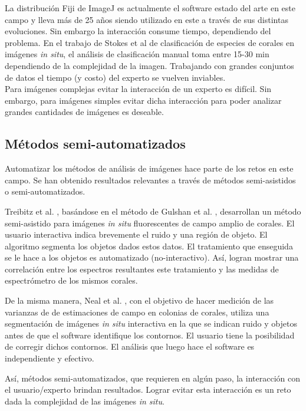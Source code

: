 \documentclass[journal]{IEEEtran}
\begin{document}
La distribución Fiji
de ImageJ \cite{schindelin_fiji:_2012} es actualmente el software estado del arte en este
campo y lleva más de 25 años \cite{schneider_nih_2012} siendo utilizado en este a través
de sus distintas evoluciones. Sin embargo la interacción consume tiempo, dependiendo del
problema. En el trabajo
de Stokes et al \cite{stokes_automated_2009} de clasificación de especies de corales en
imágenes \textit{in situ}, el análisis de clasificación manual toma entre 15-30 min dependiendo de la
complejidad de la imagen. Trabajando con grandes conjuntos de datos el tiempo (y costo)
del experto se vuelven inviables.\\


Para imágenes complejas evitar la interacción de un experto es difícil. Sin embargo, para
imágenes simples evitar dicha interacción para poder analizar grandes cantidades de
imágenes es deseable.


\subsection{Métodos semi-automatizados}
Automatizar los métodos de análisis de imágenes hace parte de los retos en este campo.
Se han obtenido resultados relevantes a través de métodos semi-asistidos o
semi-automatizados. 

Treibitz et al. \cite{treibitz_wide_2015}, basándose en el método de
Gulshan et al. \cite{gulshan_geodesic_2010}, desarrollan un método semi-asistido para
imágenes \textit{in situ} fluorescentes de campo amplio de corales. El usuario interactiva indica
brevemente el ruido y una región de objeto. El algoritmo segmenta los objetos dados estos
datos. El tratamiento que enseguida se le hace a los objetos es automatizado
(no-interactivo). Así, logran mostrar una correlación entre los espectros resultantes
este tratamiento y las medidas de espectrómetro de los mismos corales. 

De la misma manera, Neal et al. \cite{neal_methods_2015}, con el objetivo de hacer medición de las varianzas de de estimaciones de campo en colonias de corales, utiliza una
segmentación de imágenes \textit{in situ} interactiva en la que se indican ruido y objetos antes de que el software identifique los contornos. El usuario tiene la posibilidad de corregir dichos contornos. El análisis que luego hace el software es independiente y efectivo.

Así, métodos semi-automatizados, que requieren en algún paso, la interacción con el
usuario/experto brindan resultados. Lograr evitar esta interacción es un reto dada la
complejidad de las imágenes \textit{in situ}. 
\end{document}
